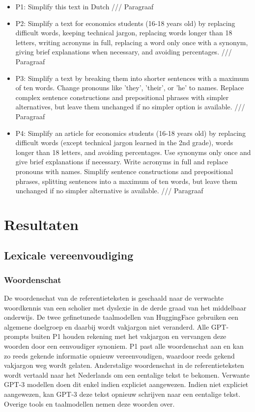 \begin{itemize}
	\item P1: Simplify this text in Dutch /// Paragraaf
	\item P2: Simplify a text for economics students (16-18 years old) by replacing difficult words, keeping technical jargon, replacing words longer than 18 letters, writing acronyms in full, replacing a word only once with a synonym, giving brief explanations when necessary, and avoiding percentages. /// Paragraaf
	\item P3: Simplify a text by breaking them into shorter sentences with a maximum of ten words. Change pronouns like 'they', 'their', or 'he' to names. Replace complex sentence constructions and prepositional phrases with simpler alternatives, but leave them unchanged if no simpler option is available. /// Paragraaf
	\item P4: Simplify an article for economics students (16-18 years old) by replacing difficult words (except technical jargon learned in the 2nd grade), words longer than 18 letters, and avoiding percentages. Use synonyms only once and give brief explanations if necessary. Write acronyms in full and replace pronouns with names. Simplify sentence constructions and prepositional phrases, splitting sentences into a maximum of ten words, but leave them unchanged if no simpler alternative is available. /// Paragraaf
\end{itemize}

\section{Resultaten}

\subsection{Lexicale vereenvoudiging}

\subsubsection{Woordenschat}
De woordenschat van de referentieteksten is geschaald naar de verwachte woordkennis van een scholier met dyslexie in de derde graad van het middelbaar onderwijs. De twee gefinetunede taalmodellen van HuggingFace gebruiken een algemene doelgroep en daarbij wordt vakjargon niet veranderd. Alle GPT-prompts buiten P1 houden rekening met het vakjargon en vervangen deze woorden door een eenvoudiger synoniem. P1 past alle woordenschat aan en kan zo reeds gekende informatie opnieuw vereenvoudigen, waardoor reeds gekend vakjargon weg wordt gelaten. Anderstalige woordenschat in de referentieteksten wordt vertaald naar het Nederlands om een eentalige tekst te bekomen. Verwante GPT-3 modellen doen dit enkel indien expliciet aangewezen. Indien niet expliciet aangewezen, kan GPT-3 deze tekst opnieuw schrijven naar een eentalige tekst. Overige tools en taalmodellen nemen deze woorden over. 

